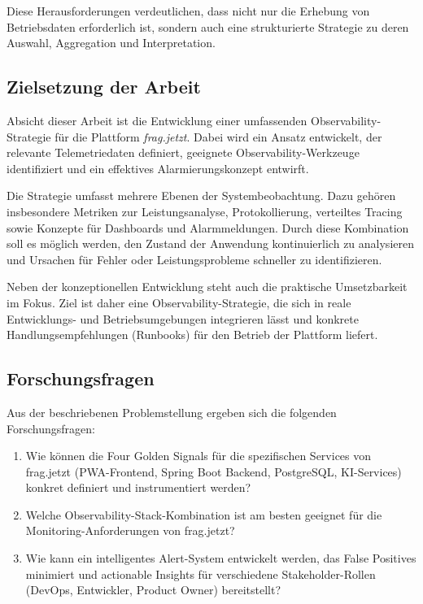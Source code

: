 Diese Herausforderungen verdeutlichen, dass nicht nur die Erhebung von Betriebsdaten erforderlich ist, sondern auch eine strukturierte Strategie zu deren Auswahl, Aggregation und Interpretation.

\subsection{Zielsetzung der Arbeit}

Absicht dieser Arbeit ist die Entwicklung einer umfassenden Observability-Strategie für die Plattform \emph{frag.jetzt}. Dabei wird ein Ansatz entwickelt, der relevante Telemetriedaten definiert, geeignete Observability-Werkzeuge identifiziert und ein effektives Alarmierungskonzept entwirft.

Die Strategie umfasst mehrere Ebenen der Systembeobachtung. Dazu gehören insbesondere Metriken zur Leistungsanalyse, Protokollierung, verteiltes Tracing sowie Konzepte für Dashboards und Alarmmeldungen. Durch diese Kombination soll es möglich werden, den Zustand der Anwendung kontinuierlich zu analysieren und Ursachen für Fehler oder Leistungsprobleme schneller zu identifizieren.

Neben der konzeptionellen Entwicklung steht auch die praktische Umsetzbarkeit im Fokus. Ziel ist daher eine Observability-Strategie, die sich in reale Entwicklungs- und Betriebsumgebungen integrieren lässt und konkrete Handlungsempfehlungen (Runbooks) für den Betrieb der Plattform liefert.

\subsection{Forschungsfragen}

Aus der beschriebenen Problemstellung ergeben sich die folgenden Forschungsfragen:

\begin{enumerate}
\item Wie können die Four Golden Signals für die spezifischen Services von frag.jetzt (PWA-Frontend, Spring Boot Backend, PostgreSQL, KI-Services) konkret definiert und instrumentiert werden?

\item Welche Observability-Stack-Kombination ist am besten geeignet für die Monitoring-Anforderungen von frag.jetzt?

\item Wie kann ein intelligentes Alert-System entwickelt werden, das False Positives minimiert und actionable Insights für verschiedene Stakeholder-Rollen (DevOps, Entwickler, Product Owner) bereitstellt?
\end{enumerate}

